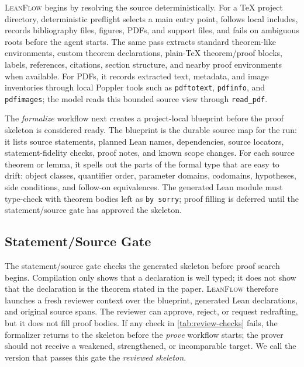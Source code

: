 \documentclass{article}
\newcommand{\method}{\textsc{LeanFlow}\xspace}
\newcommand{\lean}{Lean\xspace}
\begin{document}
\method begins by resolving the source deterministically.
For a \TeX{} project directory, deterministic preflight selects a main entry point, follows local includes, records bibliography files, figures, PDFs, and support files, and fails on ambiguous roots before the agent starts.
The same pass extracts standard theorem-like environments, custom theorem declarations, plain-\TeX{} theorem/proof blocks, labels, references, citations, section structure, and nearby proof environments when available.
For PDFs, it records extracted text, metadata, and image inventories through local Poppler tools such as \texttt{pdftotext}, \texttt{pdfinfo}, and \texttt{pdfimages}; the model reads this bounded source view through \texttt{read\_pdf}.

The \emph{formalize} workflow next creates a project-local blueprint before the proof skeleton is considered ready.
The blueprint is the durable source map for the run: it lists source statements, planned \lean names, dependencies, source locators, statement-fidelity checks, proof notes, and known scope changes.
For each source theorem or lemma, it spells out the parts of the formal type that are easy to drift: object classes, quantifier order, parameter domains, codomains, hypotheses, side conditions, and follow-on equivalences.
The generated \lean module must type-check with theorem bodies left as \texttt{by sorry}; proof filling is deferred until the statement/source gate has approved the skeleton.

\subsection{Statement/Source Gate}

The statement/source gate checks the generated skeleton before proof search begins.
Compilation only shows that a declaration is well typed; it does not show that the declaration is the theorem stated in the paper.
\method therefore launches a fresh reviewer context over the blueprint, generated \lean declarations, and original source spans.
The reviewer can approve, reject, or request redrafting, but it does not fill proof bodies.
If any check in \cref{tab:review-checks} fails, the formalizer returns to the skeleton before the \emph{prove} workflow starts; the prover should not receive a weakened, strengthened, or incomparable target.
We call the version that passes this gate the \emph{reviewed skeleton}.
\end{document}
